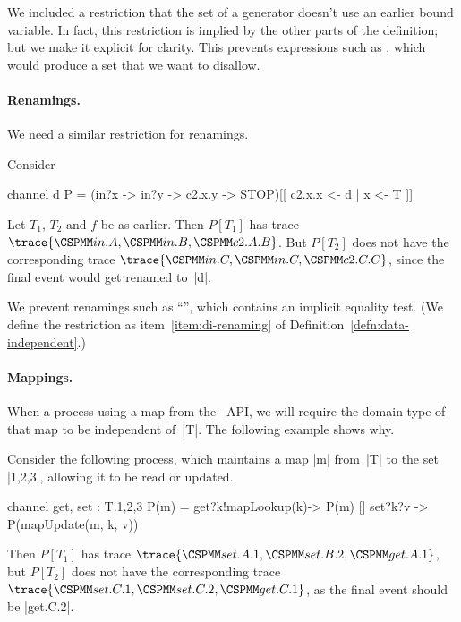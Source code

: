 We included a restriction that the set of a generator doesn't use an earlier
bound variable.  In fact, this restriction is implied by the other parts of
the definition; but we make it explicit for clarity.  This prevents
expressions such as
, which would produce a set that we
want to disallow.   




\paragraph{Renamings.}

We need a similar restriction for renamings.  
\begin{example}
Consider
%
\begin{cspm}
channel d
P = (in?x -> in?y -> c2.x.y -> STOP)[[ c2.x.x <- d | x <- T ]]
\end{cspm}
%
Let $T_1$, $T_2$ and $f$ be as earlier.  Then $P[T_1]$ has trace
$\trace{\M{in}.A, \M{in}.B, \M{c2}.A.B}$.  But $P[T_2]$ does not have the
corresponding trace $\trace{\M{in}.C, \M{in}.C, \M{c2}.C.C}$, since the final
event would get renamed to~|d|.  
\end{example}
%
We prevent renamings such as ``'', which contains an
implicit equality test.  (We define the restriction as
item~\ref{item:di-renaming} of Definition~\ref{defn:data-independent}.)


\paragraph{Mappings.}  

When a process using a map from the \CSPm\ API, we will require the domain
type of that map to be independent of~|T|.  The following example shows why.
%
\begin{example}
Consider the following process, which maintains a map |m| from~|T| to the set
|{1,2,3}|, allowing it to be read or updated.
\begin{cspm}
channel get, set : T.{1,2,3}
P(m) = 
  get?k!mapLookup(k)-> P(m)
  [] set?k?v -> P(mapUpdate(m, k, v))
\end{cspm}
Then $P[T_1]$ has trace $\trace{\M{set.A.1}, \M{set.B.2}, \M{get.A.1}}$, but
$P[T_2]$ does not have the corresponding trace $\trace{\M{set.C.1},
  \M{set.C.2}, \M{get.C.1}}$, as the final event should be |get.C.2|.
\end{example}



